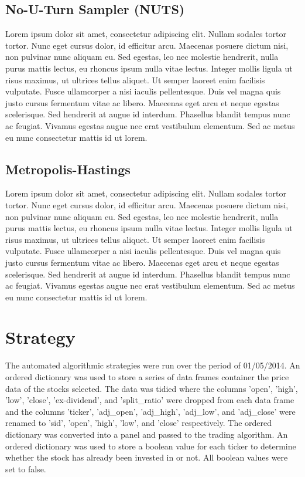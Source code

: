 \subsection{No-U-Turn Sampler (NUTS)}
Lorem ipsum dolor sit amet, consectetur adipiscing elit. Nullam sodales tortor tortor. Nunc eget cursus dolor, id efficitur arcu. Maecenas posuere dictum nisi, non pulvinar nunc aliquam eu. Sed egestas, leo nec molestie hendrerit, nulla purus mattis lectus, eu rhoncus ipsum nulla vitae lectus. Integer mollis ligula ut risus maximus, ut ultrices tellus aliquet. Ut semper laoreet enim facilisis vulputate. Fusce ullamcorper a nisi iaculis pellentesque. Duis vel magna quis justo cursus fermentum vitae ac libero. Maecenas eget arcu et neque egestas scelerisque. Sed hendrerit at augue id interdum. Phasellus blandit tempus nunc ac feugiat. Vivamus egestas augue nec erat vestibulum elementum. Sed ac metus eu nunc consectetur mattis id ut lorem.

\subsection{Metropolis-Hastings}
Lorem ipsum dolor sit amet, consectetur adipiscing elit. Nullam sodales tortor tortor. Nunc eget cursus dolor, id efficitur arcu. Maecenas posuere dictum nisi, non pulvinar nunc aliquam eu. Sed egestas, leo nec molestie hendrerit, nulla purus mattis lectus, eu rhoncus ipsum nulla vitae lectus. Integer mollis ligula ut risus maximus, ut ultrices tellus aliquet. Ut semper laoreet enim facilisis vulputate. Fusce ullamcorper a nisi iaculis pellentesque. Duis vel magna quis justo cursus fermentum vitae ac libero. Maecenas eget arcu et neque egestas scelerisque. Sed hendrerit at augue id interdum. Phasellus blandit tempus nunc ac feugiat. Vivamus egestas augue nec erat vestibulum elementum. Sed ac metus eu nunc consectetur mattis id ut lorem.

\section{Strategy}
The automated algorithmic strategies were run over the period of 01/05/2014. An ordered dictionary was used to store a series of data frames container the price data of the stocks selected. The data was tidied where the columns 'open', 'high', 'low', 'close', 'ex-dividend', and 'split\_ratio' were dropped from each data frame and the columns 'ticker', 'adj\_open', 'adj\_high', 'adj\_low', and 'adj\_close' were renamed to 'sid', 'open', 'high', 'low', and 'close' respectively. The ordered dictionary was converted into a panel and passed to the trading algorithm. An ordered dictionary was used to store a boolean value for each ticker to determine whether the stock has already been invested in or not. All boolean values were set to false. 

